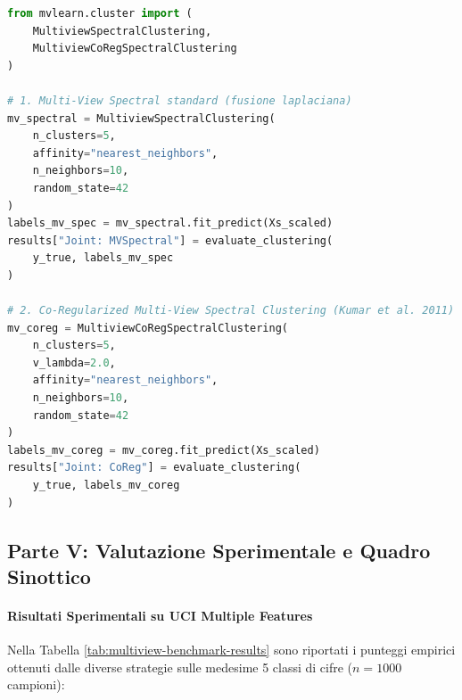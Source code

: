 \begin{lstlisting}[language=Python, caption={Esecuzione di Multi-View Spectral Clustering e Co-Regularized Spectral Clustering.}]
from mvlearn.cluster import (
    MultiviewSpectralClustering,
    MultiviewCoRegSpectralClustering
)

# 1. Multi-View Spectral standard (fusione laplaciana)
mv_spectral = MultiviewSpectralClustering(
    n_clusters=5,
    affinity="nearest_neighbors",
    n_neighbors=10,
    random_state=42
)
labels_mv_spec = mv_spectral.fit_predict(Xs_scaled)
results["Joint: MVSpectral"] = evaluate_clustering(
    y_true, labels_mv_spec
)

# 2. Co-Regularized Multi-View Spectral Clustering (Kumar et al. 2011)
mv_coreg = MultiviewCoRegSpectralClustering(
    n_clusters=5,
    v_lambda=2.0,
    affinity="nearest_neighbors",
    n_neighbors=10,
    random_state=42
)
labels_mv_coreg = mv_coreg.fit_predict(Xs_scaled)
results["Joint: CoReg"] = evaluate_clustering(
    y_true, labels_mv_coreg
)
\end{lstlisting}

\FloatBarrier
\subsection{Parte V: Valutazione Sperimentale e Quadro Sinottico}
\label{sec:lab-experimental-comparison}

\paragraph{Risultati Sperimentali su UCI Multiple Features}
Nella Tabella \ref{tab:multiview-benchmark-results} sono riportati i punteggi empirici ottenuti dalle diverse strategie sulle medesime 5 classi di cifre ($n=1000$ campioni):


